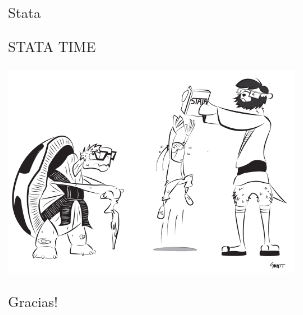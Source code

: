 \documentclass[11pt, aspectratio=169, compress]{beamer}
\makeatletter
\def\beamer@writeslidentry@miniframesoff{%
	\expandafter\beamer@ifempty\expandafter{\beamer@framestartpage}{}%
	{%
		\clearpage\beamer@notesactions%
	}
}
\newcommand*{\miniframesoff}{\let\beamer@writeslidentry=\beamer@writeslidentry@miniframesoff}
\makeatother
\begin{document}
\begin{frame}{Stata}
	\begin{center}
	\LARGE STATA TIME
		\begin{center}
		\includegraphics[width=0.57\textwidth]{fig1.pdf}
		\end{center}
	\end{center}
\end{frame}
\miniframesoff 	
\begin{frame}
Gracias! 
\end{frame}
\end{document}
